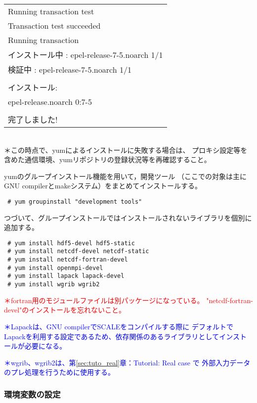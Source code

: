 {{{\begin{tabular}{l}
Running transaction test\\
Transaction test succeeded\\
Running transaction\\
  インストール中          : epel-release-7-5.noarch                         1/1\\
  検証中                  : epel-release-7-5.noarch                         1/1\\
\\
インストール:\\
  epel-release.noarch 0:7-5\\
\\
完了しました!\\
\end{tabular}
}}}\\

{\small ＊この時点で、yumによるインストールに失敗する場合は、
プロキシ設定等を含めた通信環境、yumリポジトリの登録状況等を再確認すること。}

\noindent yumのグループインストール機能を用いて，開発ツール
（ここでの対象は主にGNU compilerとmakeシステム）をまとめてインストールする。
\begin{verbatim}
 # yum groupinstall "development tools"
\end{verbatim}

\noindent つづいて、グループインストールではインストールされないライブラリを個別に追加する。
\begin{verbatim}
 # yum install hdf5-devel hdf5-static
 # yum install netcdf-devel netcdf-static
 # yum install netcdf-fortran-devel
 # yum install openmpi-devel
 # yum install lapack lapack-devel
 # yum install wgrib wgrib2
\end{verbatim}

\noindent \textcolor{red}{\small ＊fortran用のモジュールファイルは別パッケージになっている。
"netcdf-fortran-devel"のインストールを忘れないこと。}

\noindent \textcolor{blue}{\small ＊Lapackは、GNU compilerでSCALEをコンパイルする際に
デフォルトでLapackを利用する設定であるため、依存関係のあるライブラリとしてインストールが必要になる。}

\noindent \textcolor{blue}{\small ＊wgrib、wgrib2は、第\ref{sec:tuto_real}章：Tutorial: Real case で
外部入力データのプレ処理を行うために使用する。}


\subsubsection{環境変数の設定}


